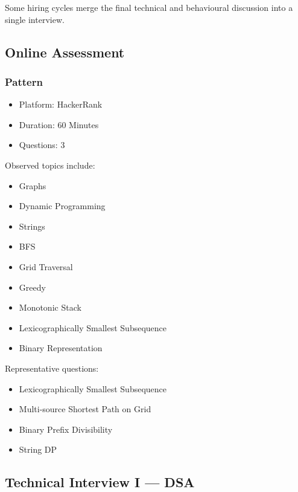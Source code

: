 \documentclass[11pt,a4paper]{article}
\begin{document}
Some hiring cycles merge the final technical and behavioural discussion into a single interview.


\subsection{Online Assessment}

\subsubsection{Pattern}

\begin{itemize}
	\item Platform: HackerRank
	\item Duration: 60 Minutes
	\item Questions: 3
\end{itemize}

Observed topics include:

\begin{itemize}
	\item Graphs
	\item Dynamic Programming
	\item Strings
	\item BFS
	\item Grid Traversal
	\item Greedy
	\item Monotonic Stack
	\item Lexicographically Smallest Subsequence
	\item Binary Representation
\end{itemize}

Representative questions:

\begin{itemize}
	\item Lexicographically Smallest Subsequence
	\item Multi-source Shortest Path on Grid
	\item Binary Prefix Divisibility
	\item String DP
\end{itemize}


\subsection{Technical Interview I --- DSA}
\end{document}
